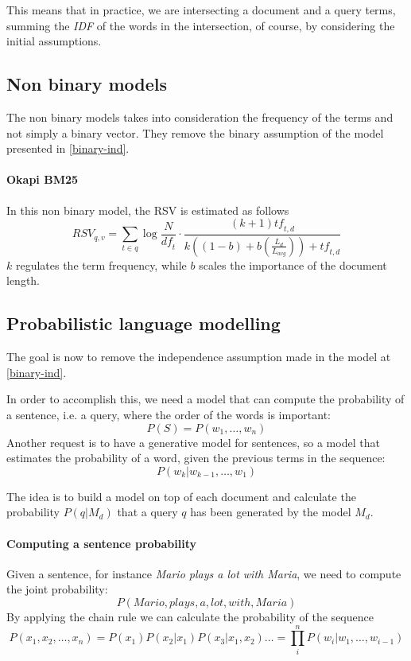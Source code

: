 This means that in practice, we are intersecting a document and a query terms, 
summing the \emph{IDF} of the words in the intersection, of course, by
considering the initial assumptions.

\subsection{Non binary models}
The non binary models takes into consideration the frequency of the terms 
and not simply a binary vector. They remove the binary assumption 
of the model presented in \vref{binary-ind}.

\paragraph{Okapi BM25}
In this non binary model, the RSV is estimated as follows
$$\mathit{RSV}_{q,v} = \sum_{t \in q}\log \frac{N}{\mathit{df}_t} 
\cdot \frac{(k+1)\mathit{tf}_{t,d}}{k((1-b) + b (\frac{L_d}{L_{\mathit{avg}}})) 
+ \mathit{tf}_{t,d}}$$
$k$ regulates the term frequency, while $b$ scales the importance of 
the document length.

\subsection{Probabilistic language modelling}
The goal is now to remove the independence assumption made in the model 
at \vref{binary-ind}.

In order to accomplish this, we need a model that can compute the probability 
of a sentence, i.e. a query, where the order of the words is important:
$$P(S) = P(w_1, \dots, w_n)$$
Another request is to have a generative model for sentences, so a model 
that estimates the probability of a word, given the previous terms in the 
sequence:
$$P(w_k | w_{k-1}, \dots, w_1)$$

The idea is to build a model on top of each document and calculate 
the probability $P(q|M_d)$ that a query $q$ has been generated by the model 
$M_d$.

\paragraph{Computing a sentence probability}
Given a sentence, for instance \emph{Mario plays a lot with Maria}, 
we need to compute the joint probability:
$$P(\mathit{Mario}, \mathit{plays}, \mathit{a}, \mathit{lot}, \mathit{with}, \mathit{Maria})$$
By applying the chain rule we can calculate the probability of the sequence
$$P(x_1, x_2, \dots, x_n) = P(x_1)P(x_2|x_1)P(x_3|x_1,x_2)\dots = \prod_i^nP(w_i|w_1, \dots, w_{i-1})$$ 

